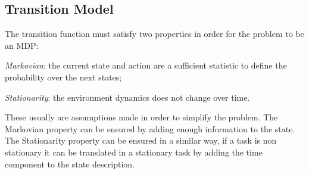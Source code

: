  \subsection{Transition Model}
The transition function must satisfy two properties in order for the problem to be an MDP:
\begin{description}
\item \textit{Markovian}: the current state and action are a sufficient statistic to define the probability over the next states;%
\item \textit{Stationarity}: the environment dynamics does not change over time. %
\end{description}
These usually are assumptions made in order to simplify the problem. The Markovian property can be ensured by adding enough information to the state. The Stationarity property can be ensured in a similar way, if a task is non stationary it can be translated in a stationary task by adding the time component  to the state description.

